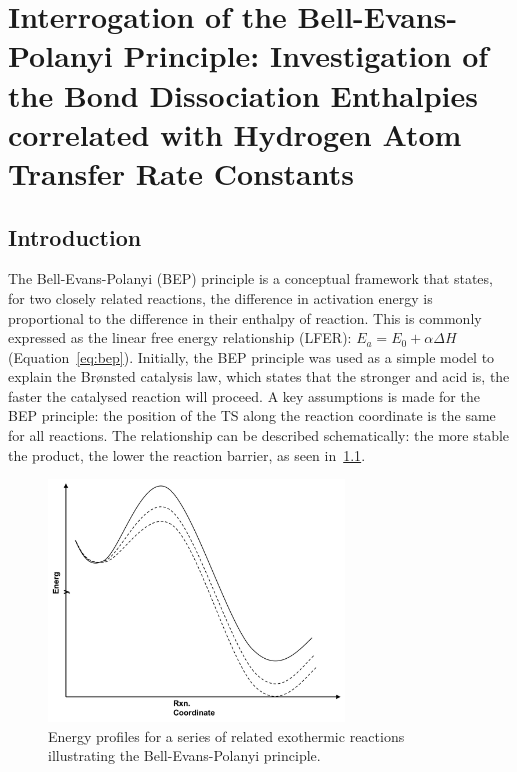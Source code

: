 
\chapter{Interrogation of the Bell-Evans-Polanyi Principle: Investigation of the Bond Dissociation Enthalpies correlated with Hydrogen Atom Transfer Rate Constants}
\label{ch:bde}

\section{Introduction}

The Bell-Evans-Polanyi (BEP) principle is a conceptual framework that states, for two closely related reactions, the difference in activation energy is proportional to the difference in their enthalpy of reaction.\cite{Bell1936,Evans1938,Dill2003} This is commonly expressed as the linear free energy relationship (LFER): $E_a = E_0 + \alpha \Delta H$ (Equation~\ref{eq:bep}). Initially, the BEP principle was used as a simple model to explain the Br{\o}nsted catalysis law, which states that the stronger and acid is, the faster the catalysed reaction will proceed.\cite{Bronsted1924} A key assumptions is made for the BEP principle: the position of the TS along the reaction coordinate is the same for all reactions. The relationship can be described schematically: the more stable the product, the lower the reaction barrier, as seen in~\ref{fig:bep}.

\begin{figure}[!htbp]
  \centering
  \includegraphics[width=0.7\textwidth]{figures/bep}
  \caption{Energy profiles for a series of related exothermic reactions illustrating the Bell-Evans-Polanyi principle.}
\label{fig:bep}
\end{figure}

